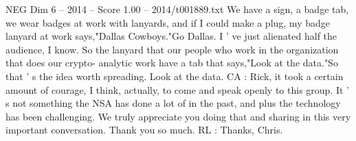 \begin{textsample}{NEG Dim 6 – 2014 – Score 1.00 – 2014/t001889.txt}
We have a sign, a badge tab, we wear badges at work with lanyards, and if I could make a plug, my badge lanyard at work says,"Dallas Cowboys."Go Dallas.
I ' ve just alienated half the audience, I know.
So the lanyard that our people who work in the organization that does our crypto- analytic work have a tab that says,"Look at the data."So that ' s the idea worth spreading.
Look at the data.
CA : Rick, it took a certain amount of courage, I think, actually, to come and speak openly to this group.
It ' s not something the NSA has done a lot of in the past, and plus the technology has been challenging.
We truly appreciate you doing that and sharing in this very important conversation.
Thank you so much.
RL : Thanks, Chris.

\end{textsample}
